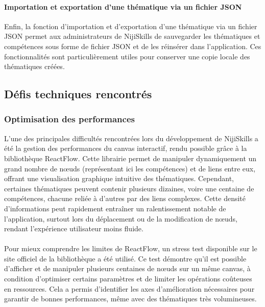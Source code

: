 \documentclass[12pt]{article}
\begin{document}
\paragraph{Importation et exportation d'une thématique via un fichier JSON\\}
Enfin, la fonction d'importation et d'exportation d'une thématique via un fichier JSON permet aux administrateurs de NijiSkills de sauvegarder les thématiques et compétences sous forme de fichier JSON et de les réinsérer dans l'application. Ces fonctionnalités sont particulièrement utiles pour conserver une copie locale des thématiques créées.
\subsection{Défis techniques rencontrés}
\subsubsection{Optimisation des performances}
L’une des principales difficultés rencontrées lors du développement de NijiSkills a été la gestion des performances du canvas interactif, rendu possible grâce à la bibliothèque ReactFlow. Cette librairie permet de manipuler dynamiquement un grand nombre de nœuds (représentant ici les compétences) et de liens entre eux, offrant une visualisation graphique intuitive des thématiques. Cependant, certaines thématiques peuvent contenir plusieurs dizaines, voire une centaine de compétences, chacune reliée à d’autres par des liens complexes. Cette densité d’informations peut rapidement entraîner un ralentissement notable de l’application, surtout lors du déplacement ou de la modification de nœuds, rendant l’expérience utilisateur moins fluide.
\\\\
Pour mieux comprendre les limites de ReactFlow, un stress test disponible sur le site officiel de la bibliothèque a été utilisé. Ce test démontre qu’il est possible d’afficher et de manipuler plusieurs centaines de nœuds sur un même canvas, à condition d’optimiser certains paramètres et de limiter les opérations coûteuses en ressources. Cela a permis d’identifier les axes d’amélioration nécessaires pour garantir de bonnes performances, même avec des thématiques très volumineuses.
\end{document}
